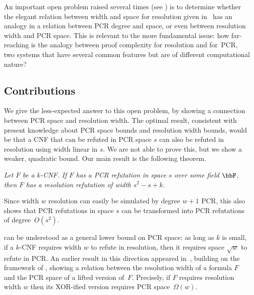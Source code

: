 \documentclass{toc}
\begin{document}
An important open problem raised several times 
(see \cite{NorSurvey15,DBLP:journals/jacm/BonacinaG15,DBLP:journals/siamcomp/FilmusLNRT15,DBLP:conf/icalp/BerkholzN16,DBLP:conf/icalp/FilmusLMNV13,DBLP:journals/tocl/FilmusLMNV15}) 
is to determine whether the elegant relation between width and space for resolution given in~\cite{DBLP:journals/jcss/AtseriasD08} 
has an analogy in a relation between PCR degree and space, or even between resolution width and PCR space. 
This is relevant to the more fundamental issue: how far-reaching is the analogy between proof complexity for resolution
and for~PCR, two systems that have several common features but are of different computational nature? 


\subsection{Contributions}\label{subsec:contributions}

We give the less-expected answer to this open problem, by showing a 
connection between PCR space and resolution width.
The optimal result, consistent with present knowledge about
PCR space  bounds and resolution width bounds,  would be that a CNF that can be refuted in PCR space $s$ 
can also be refuted in resolution using width linear in $s$.
We are not able to prove this, but we show
 a weaker, quadratic bound.
Our main result is the following theorem. 
\begin{mainthm} 
\emph{Let $F$ be a $k$-CNF. If $F$ has a PCR refutation in space $s$ over some field $\bbF$, 
then $F$ has a resolution refutation of width $s^2-s+k$.}
\end{mainthm}

Since width $w$ resolution  can easily be simulated by degree $w+1$ PCR, 
this also shows that PCR refutations in space $s$ can be transformed into  PCR refutations of degree~$O(s^2)$.  

 can be understood as a general lower bound on PCR space:
as long as $k$ is small, 
if a $k$-CNF requires width $w$ to refute in resolution, then 
it requires space $\sqrt{w}$ to refute in PCR. 
%
An earlier result in this direction
appeared in~\cite{DBLP:conf/icalp/FilmusLMNV13},
building on the framework of \cite{ABRW, DBLP:journals/jacm/BonacinaG15},
showing
a relation between the resolution width of a formula $F$ and the PCR space of a lifted version of~$F$.
Precisely,
if $F$ requires  resolution width $w$
then its XOR-ified version requires PCR space~$\Omega(w)$.
\end{document}
